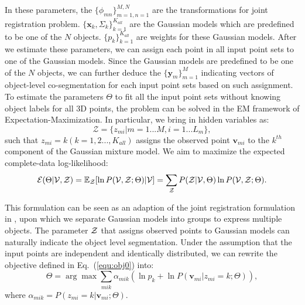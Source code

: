 In these parameters, the  $\{\phi_{mn}\}_{m=1,n=1}^{M,N}$ are the transformations for joint registration problem. $ \{\mathbf{x}_{k},\Sigma_k\}_{k=1}^{K_{all}}$ are the Gaussian models which are predefined to be one of the $N$ objects. $\{p_k\}_{k=1}^{K_{all}} $ are weights for these Gaussian models. After we estimate these parameters, we can assign each point in all input point sets to one of the Gaussian models. Since the Gaussian models are predefined to be one of the $N$ objects, we can further deduce the $\{\mathbf{y}_m\}_{m=1}^M$ indicating vectors of object-level co-segmentation for each input point sets based on such assignment.
To estimate the parameters $\Theta$ to fit all the input point sets without knowing object labels for all 3D points, the problem can be solved in the EM framework of Expectation-Maximization. 
%
In particular, we bring in hidden variables as: 
\begin{equation}
\mathcal{Z}=\{z_{mi}|m=1...M,i=1...L_m\},
\end{equation}
%
such that $z_{mi}=k(k=1,2...,K_{all})$ assigns the observed point $\mathbf{v}_{mi}$ to the $k^{th}$ component of the Gaussian mixture model. 
%
We aim to maximize the expected complete-data log-likelihood:
\begin{equation}
\label{equ:obj0}
\mathcal{E}(\Theta|\mathcal{V},\mathcal{Z})=\mathbb{E}_{\mathcal{Z}}[\ln P(\mathcal{V},\mathcal{Z};\Theta)|\mathcal{V}]={\sum_{\mathcal{Z}}P(\mathcal{Z}|\mathcal{V},\Theta)\ln{P(\mathcal{V},\mathcal{Z};\Theta)}}.
\end{equation}


This formulation can be seen as an adaption of the joint registration formulation in \cite{Evangelidis2014}, upon which we separate Gaussian models into groups to express multiple objects. 
%
The parameter $\mathcal{Z}$ that assigns observed points to Gaussian models can naturally indicate the object level segmentation.
%
Under the assumption that the input points are independent and identically distributed, we can rewrite the objective defined in Eq.~(\ref{equ:obj0}) into:
%
\begin{equation} \label{equ:obj2}
\Theta=\arg\max\sum_{mik}\alpha_{mik}(\ln p_k + \ln P(\mathbf{v}_{mi}|z_{mi}=k;\Theta)),
\end{equation}
%
where $\alpha_{mik} = P( z_{mi} = k | \mathbf{v}_{mi} ; \Theta )$.


